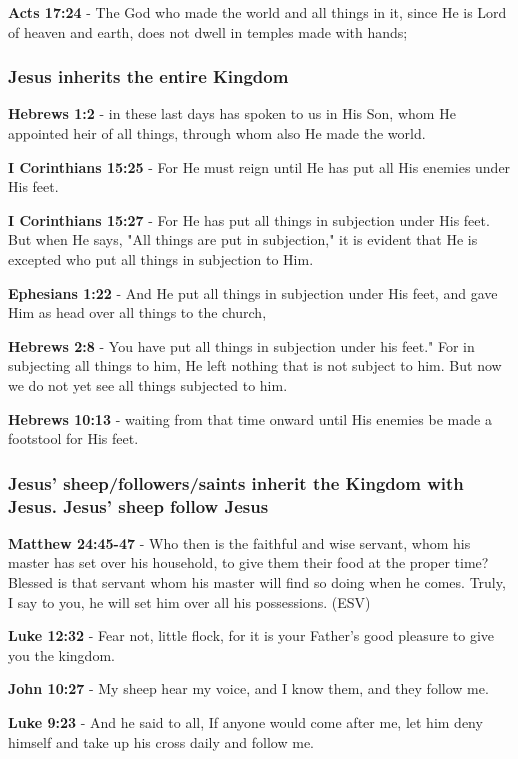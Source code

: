 \documentclass[11pt]{article}
\begin{document}
\textbf{Acts 17:24} - The God who made the world and all things in it, since He is Lord of heaven and earth, does not dwell in temples made with hands;

\subsubsection{Jesus inherits the entire Kingdom}
\label{sec:orga925985}
\textbf{Hebrews 1:2} - in these last days has spoken to us in His Son, whom He appointed heir of all things, through whom also He made the world.

\textbf{I Corinthians 15:25} - For He must reign until He has put all His enemies under His feet.

\textbf{I Corinthians 15:27} - For He has put all things in subjection under His feet. But when He says, "All things are put in subjection," it is evident that He is excepted who put all things in subjection to Him.

\textbf{Ephesians 1:22} - And He put all things in subjection under His feet, and gave Him as head over all things to the church,

\textbf{Hebrews 2:8} - You have put all things in subjection under his feet." For in subjecting all things to him, He left nothing that is not subject to him. But now we do not yet see all things subjected to him.

\textbf{Hebrews 10:13} - waiting from that time onward until His enemies be made a footstool for His feet.

\subsubsection{Jesus' sheep/followers/saints inherit the Kingdom with Jesus. Jesus' sheep follow Jesus}
\label{sec:org5ad00f2}
\textbf{Matthew 24:45-47} -  Who then is the faithful and wise servant, whom his master has set over his household, to give them their food at the proper time?  Blessed is that servant whom his master will find so doing when he comes.  Truly, I say to you, he will set him over all his possessions.  (ESV)

\textbf{Luke 12:32} - Fear not, little flock, for it is your Father's good pleasure to give you the kingdom.

\textbf{John 10:27} - My sheep hear my voice, and I know them, and they follow me.

\textbf{Luke 9:23} - And he said to all, If anyone would come after me, let him deny himself and take up his cross daily and follow me.
\end{document}
